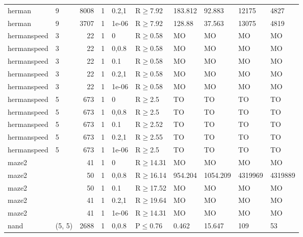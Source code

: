 \begin{longtable}{llrrllllll}
 herman        & 9        &   	8008 & 1 & 0.2,1 & R$\geq$7.92  & 183.812  & 92.883   & 12175   & 4827    \\
 herman        & 9        &   	3707 & 1 & 1e-06 & R$\geq$7.92  & 128.88   & 37.563   & 13075   & 4819    \\
 hermanspeed   & 3        &     	22 & 1 & 0     & R$\geq$0.58  & MO       & MO       & MO      & MO      \\
 hermanspeed   & 3        &     	22 & 1 & 0,0.8 & R$\geq$0.58  & MO       & MO       & MO      & MO      \\
 hermanspeed   & 3        &     	22 & 1 & 0.1   & R$\geq$0.58  & MO       & MO       & MO      & MO      \\
 hermanspeed   & 3        &     	22 & 1 & 0.2,1 & R$\geq$0.58  & MO       & MO       & MO      & MO      \\
 hermanspeed   & 3        &     	22 & 1 & 1e-06 & R$\geq$0.58  & MO       & MO       & MO      & MO      \\
 hermanspeed   & 5        &    	673 & 1 & 0     & R$\geq$2.5   & TO       & TO       & TO      & TO      \\
 hermanspeed   & 5        &    	673 & 1 & 0,0.8 & R$\geq$2.5   & TO       & TO       & TO      & TO      \\
 hermanspeed   & 5        &    	673 & 1 & 0.1   & R$\geq$2.52  & TO       & TO       & TO      & TO      \\
 hermanspeed   & 5        &    	673 & 1 & 0.2,1 & R$\geq$2.55  & TO       & TO       & TO      & TO      \\
 hermanspeed   & 5        &    	673 & 1 & 1e-06 & R$\geq$2.5   & TO       & TO       & TO      & TO      \\
 maze2         &          &     	41 & 1 & 0     & R$\geq$14.31 & MO       & MO       & MO      & MO      \\
 maze2         &          &     	50 & 1 & 0,0.8 & R$\geq$16.14 & 954.204  & 1054.209 & 4319969 & 4319889 \\
 maze2         &          &     	50 & 1 & 0.1   & R$\geq$17.52 & MO       & MO       & MO      & MO      \\
 maze2         &          &     	41 & 1 & 0.2,1 & R$\geq$19.64 & MO       & MO       & MO      & MO      \\
 maze2         &          &     	41 & 1 & 1e-06 & R$\geq$14.31 & MO       & MO       & MO      & MO      \\
 nand          & (5, 5)   &   	2688 & 1 & 0,0.8 & P$\leq$0.76  & 0.462    & 15.647   & 109     & 53      \\

\end{longtable}
